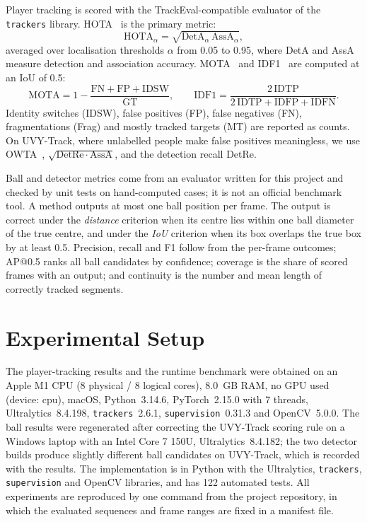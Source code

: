 \documentclass[conference]{IEEEtran}
\begin{document}
Player tracking is scored with the TrackEval-compatible evaluator of the
\texttt{trackers} library. HOTA~\cite{hota} is the primary metric:
\begin{equation}
\mathrm{HOTA}_{\alpha}=\sqrt{\mathrm{DetA}_{\alpha}\,\mathrm{AssA}_{\alpha}},
\label{eq:hota}
\end{equation}
averaged over localisation thresholds $\alpha$ from 0.05 to 0.95, where DetA and
AssA measure detection and association accuracy. MOTA~\cite{clear} and
IDF1~\cite{idf1} are computed at an IoU of 0.5:
\begin{equation}
\mathrm{MOTA}=1-\frac{\mathrm{FN}+\mathrm{FP}+\mathrm{IDSW}}{\mathrm{GT}},\qquad
\mathrm{IDF1}=\frac{2\,\mathrm{IDTP}}{2\,\mathrm{IDTP}+\mathrm{IDFP}+\mathrm{IDFN}}.
\label{eq:mota}
\end{equation}
Identity switches (IDSW), false positives (FP), false negatives (FN),
fragmentations (Frag) and mostly tracked targets (MT) are reported as counts. On
UVY-Track, where unlabelled people make false positives meaningless, we use
OWTA~\cite{owta}, $\sqrt{\mathrm{DetRe}\cdot\mathrm{AssA}}$, and the detection
recall DetRe.

Ball and detector metrics come from an evaluator written for this project and
checked by unit tests on hand-computed cases; it is not an official benchmark
tool. A method outputs at most one ball position per frame. The output is
correct under the \emph{distance} criterion when its centre lies within one ball
diameter of the true centre, and under the \emph{IoU} criterion when its box
overlaps the true box by at least 0.5. Precision, recall and F1 follow from the
per-frame outcomes; AP@0.5 ranks all ball candidates by confidence; coverage is
the share of scored frames with an output; and continuity is the number and
mean length of correctly tracked segments.

\section{Experimental Setup}
The player-tracking results and the runtime benchmark were obtained on an
Apple M1 CPU (8 physical / 8 logical cores), 8.0~GB RAM, no GPU used (device: cpu), macOS, Python~3.14.6, PyTorch~2.15.0 with 7 threads, Ultralytics~8.4.198, \texttt{trackers}~2.6.1, \texttt{supervision}~0.31.3 and OpenCV~5.0.0. The ball results were regenerated after correcting the UVY-Track
scoring rule on a Windows laptop with an Intel Core 7 150U, Ultralytics~8.4.182; the two detector builds
produce slightly different ball candidates on UVY-Track, which is recorded with
the results. The implementation is in Python with the Ultralytics, \texttt{trackers},
\texttt{supervision} and OpenCV libraries, and has 122 automated tests. All
experiments are reproduced by one command from the project repository, in which
the evaluated sequences and frame ranges are fixed in a manifest file.
\end{document}
